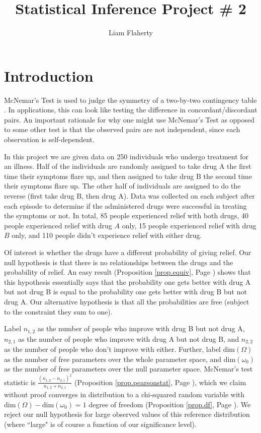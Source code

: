\documentclass[12pt, letterpaper]{article}
\title{Statistical Inference Project \# 2}
\author{Liam Flaherty}
\date{\parbox{\linewidth}{\centering%
		Professor Post\endgraf\bigskip
		NCSU: ST502-002\endgraf\bigskip
		April 17, 2024 \endgraf}}
\theoremstyle{definition}
\numberwithin{equation}{section}
\newcommand{\myprop}[1]{(Proposition \ref{#1}, Page \pageref{#1})}
\newcommand{\+}[1]{+_{\scalebox{.375}{#1}}}
\newcommand{\1}{\mathbbm{1}}
\begin{document}
\maketitle
\thispagestyle{empty}

\newpage\tableofcontents	
\newpage\clearpage\noindent

\section{Introduction}\label{section.intro}
McNemar's Test is used to judge the symmetry of a two-by-two contingency table \cite{Ritem}. In applications, this can look like testing the difference in concordant/discordant pairs. An important rationale for why one might use McNemar's Test as opposed to some other test is that the observed pairs are not independent, since each observation is self-dependent. 
\vspace{\baselineskip}

In this project we are given data on 250 individuals who undergo treatment for an illness. Half of the individuals are randomly assigned to take drug A the first time their symptoms flare up, and then assigned to take drug B the second time their symptoms flare up. The other half of individuals are assigned to do the reverse (first take drug B, then drug A). Data was collected on each subject after each episode to determine if the administered drugs were successful in treating the symptoms or not. In total, 85 people experienced relief with both drugs, 40 people experienced relief with drug $A$ only, 15 people experienced relief with drug $B$ only, and 110 people didn't experience relief with either drug.
\vspace{\baselineskip}

Of interest is whether the drugs have a different probability of giving relief. Our null hypothesis is that there is no relationships between the drugs and the probability of relief. An easy result \myprop{prop.equiv} shows that this hypothesis essentially says that the probability one gets better with drug A but not drug B is equal to the probability one gets better with drug B but not drug A. Our alternative hypothesis is that all the probabilities are free (subject to the constraint they sum to one).
\vspace{\baselineskip}

Label $n_{1,2}$ as the number of people who improve with drug B but not drug A, $n_{2,1}$ as the number of people who improve with drug A but not drug B, and $n_{2,2}$ as the number of people who don't improve with either. Further, label  $\text{dim}(\Omega)$ as the number of free parameters over the whole parameter space, and $\text{dim}(\omega_0)$ as the number of free parameters over the null parameter space. McNemar's test statistic is $\frac{(n_{1,2}-n_{2,1})^2}{n_{1,2}+n_{2,1}}$ \myprop{prop.pearsonstat}, which we claim without proof converges in distribution to a chi-squared random variable with $\text{dim}(\Omega)-\text{dim}(\omega_0)=1$ degree of freedom \myprop{prop.df}. We reject our null hypothesis for large observed values of this reference distribution (where ``large" is of course a function of our significance level).
\vspace{\baselineskip}
\end{document}
